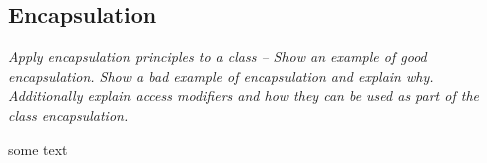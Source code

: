 \subsection{Encapsulation}
\textit{Apply encapsulation principles to a class -- Show an example of good encapsulation.  Show a bad example of encapsulation and explain why.  Additionally explain access modifiers and how they can be used as part of the class encapsulation.}

some text
